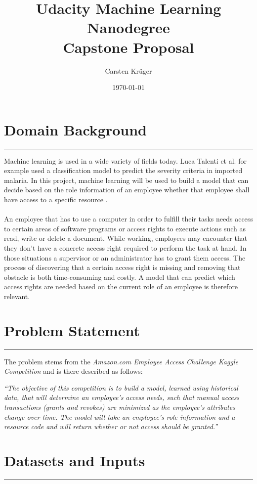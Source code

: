 \documentclass[11pt]{article}
\title{Udacity Machine Learning Nanodegree \\ Capstone Proposal}
\author{Carsten Kr\"uger}
\date{\today}
\def\sectionheader#1{\section*{#1}\vskip -0.3cm\hrule\vskip 0.3cm}
\begin{document}
\maketitle

\sectionheader{Domain Background}

Machine learning is used in a wide variety of fields today. 
Luca Talenti et al. \cite{malaria} for example used a classification model to predict 
the severity criteria in imported malaria. In this project, machine learning will be used
to build a model that can decide based on the role information of an employee whether
that employee shall have access to a specific resource \cite{kaggleAmazon}. 
\\ \\
An employee that has to use a computer in order to fulfill their tasks needs access 
to certain areas of software programs or access rights to execute actions such as read, 
write or delete a document. While working, employees may encounter that they don't have a 
concrete access right required to perform the task at hand. In those situations a supervisor or an 
administrator has to grant them access. The process of discovering that a certain access 
right is missing and removing that obstacle is both time-consuming and costly.
A model that can predict which access rights are needed based on the current role of an 
employee is therefore relevant.

\sectionheader{Problem Statement}

The problem stems from the {\it Amazon.com Employee Access Challenge Kaggle Competition} 
\cite{kaggleAmazon} and is there described as follows:

{\it ``The objective of this competition is to build a model, learned using historical data, that
 will determine an employee's access needs, such that manual access transactions 
 (grants and revokes) are minimized as the employee's attributes change over time. 
 The model will take an employee's role information and a resource code and will return whether 
 or not access should be granted.''}

\sectionheader{Datasets and Inputs}
\end{document}
